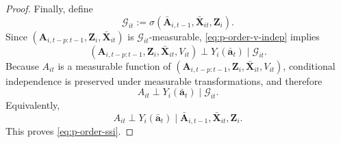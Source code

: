 \begin{proof}
Finally, define
\[
\mathcal G_{it} := \sigma(\bar{\mathbf{A}}_{i,t-1},\bar{\mathbf{X}}_{it},\mathbf{Z}_i).
\]
Since \((\mathbf{A}_{i,t-p:t-1}, \mathbf{Z}_i, \bar{\mathbf{X}}_{it})\) is \(\mathcal G_{it}\)-measurable, \eqref{eq:p-order-v-indep}
implies
\[
(\mathbf{A}_{i,t-p:t-1}, \mathbf{Z}_i, \bar{\mathbf{X}}_{it}, V_{it}) \perp Y_i(\bar{\mathbf{a}}_t)\mid \mathcal G_{it}.
\]
Because \(A_{it}\) is a measurable function of \((\mathbf{A}_{i,t-p:t-1}, \mathbf{Z}_i, \bar{\mathbf{X}}_{it}, V_{it})\), conditional
independence is preserved under measurable transformations, and therefore
\[
A_{it} \perp Y_i(\bar{\mathbf{a}}_t)\mid \mathcal G_{it}.
\]
Equivalently,
\[
A_{it} \perp Y_i(\bar{\mathbf{a}}_t)\mid \bar{\mathbf{A}}_{i,t-1},\bar{\mathbf{X}}_{it},\mathbf{Z}_i.
\]
This proves \eqref{eq:p-order-ssi}.
\end{proof}
